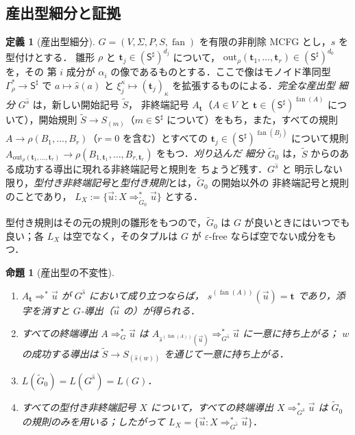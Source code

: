 \documentclass[11pt,a4paper]{ltjsarticle}
\numberwithin{equation}{section}
\theoremstyle{plain}
\newtheorem{proposition}[theorem]{命題}
\theoremstyle{definition}
\newtheorem{definition}[theorem]{定義}
\theoremstyle{remark}
\newcommand{\out}{\mathrm{out}}
\newcommand{\tuple}[1]{\vec{#1}}
\newcommand{\eps}{\varepsilon}
\newcommand{\fan}{\operatorname{fan}}
\theoremstyle{plain}
\begin{document}
\subsection{産出型細分と証拠}
\label{sec:refinement}

\begin{definition}[産出型細分]
\label{def:output-refinement}
$G=(V,\Sigma,P,S,\fan)$ を有限の非削除 MCFG とし，$s$ を型付けとする．
雛形 $\rho$ と $\mathbf t_j\in(\mathsf S^\sharp)^{d_j}$ について，
$\out_\rho(\mathbf t_1,\ldots,\mathbf t_r)\in(\mathsf S^\sharp)^{d_0}$ を，その
第 $i$ 成分が $\alpha_i$ の像であるものとする．ここで像はモノイド準同型
$\Gamma_\rho^*\to\mathsf S^\sharp$ で $a\mapsto\widehat{s}(a)$ と
$\xi_j^\kappa\mapsto(\mathbf t_j)_\kappa$ を拡張するものによる．\emph{完全な産出型
細分} $G^{\widehat{s}}$ は，新しい開始記号 $\widetilde S$，
非終端記号 $A_{\mathbf t}$（$A\in V$ と
$\mathbf t\in(\mathsf S^\sharp)^{\fan(A)}$ について），開始規則
$\widetilde S\to S_{(m)}$（$m\in\mathsf S^\sharp$ について）をもち，また，すべての規則
$A\to\rho(B_1,\ldots,B_r)$（$r=0$ を含む）とすべての
$\mathbf t_j\in(\mathsf S^\sharp)^{\fan(B_j)}$ について規則
$A_{\out_\rho(\mathbf t_1,\ldots,\mathbf t_r)}\to
\rho(B_{1,\mathbf t_1},\ldots,B_{r,\mathbf t_r})$ をもつ．\emph{刈り込んだ
細分} $\widetilde G_0$ は，$\widetilde S$ からのある成功する導出に現れる非終端記号と規則を
ちょうど残す．$G^{\widehat{s}}$ と
明示しない限り，\emph{型付き非終端記号}と\emph{型付き規則}とは，$\widetilde G_0$ の開始以外の
非終端記号と規則のことであり，
$L_X:=\{\tuple u:X\Rightarrow_{\widetilde G_0}^*\tuple u\}$ とする．
\end{definition}

型付き規則はその元の規則の雛形をもつので，$\widetilde G_0$ は
$G$ が良いときにはいつでも良い；各 $L_X$ は空でなく，そのタプルは
$G$ が $\eps$-free ならば空でない成分をもつ．

\begin{proposition}[産出型の不変性]
\label{prop:output-invariants}
\begin{enumerate}[label=(\roman*),leftmargin=*]
\item $A_{\mathbf t}\Rightarrow^*\tuple u$ が $G^{\widehat{s}}$ において成り立つならば，
$\widehat{s}^{(\fan(A))}(\tuple u)=\mathbf t$ であり，添字を消すと
$G$-導出（$\tuple u$ の）が得られる．
\item すべての終端導出 $A\Rightarrow_G^*\tuple u$ は
$A_{\widehat{s}^{(\fan(A))}(\tuple u)}\Rightarrow_{G^{\widehat{s}}}^*\tuple u$ に一意に持ち上がる；
$w$ の成功する導出は $\widetilde S\to S_{(\widehat{s}(w))}$ を通じて一意に持ち上がる．
\item $L(\widetilde G_0)=L(G^{\widehat{s}})=L(G)$．
\item すべての型付き非終端記号 $X$ について，すべての終端導出
$X\Rightarrow^*_{G^{\widehat s}}\tuple u$ は $\widetilde G_0$ の規則のみを用いる；したがって
$L_X=\{\tuple u:X\Rightarrow^*_{G^{\widehat s}}\tuple u\}$．
\end{enumerate}
\end{proposition}
\end{document}
